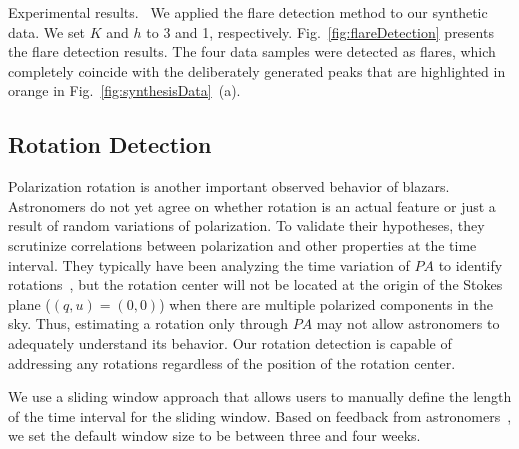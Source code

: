 \textsf{Experimental results.\ } We applied the flare detection method to our synthetic data.
We set $K$ and $h$ to 3 and 1, respectively.
Fig.~\ref{fig:flareDetection} presents the flare detection results.
The four data samples were detected as flares,
which completely coincide with the deliberately generated peaks that are highlighted in orange in Fig.~\ref{fig:synthesisData}~(a).

\subsection{Rotation Detection}\label{sec:rotationDetection}
Polarization rotation is another important observed behavior of blazars. 
Astronomers do not yet agree on whether rotation is an actual feature or just a result of random variations of polarization.
To validate their hypotheses, they scrutinize correlations between polarization and other properties at the time interval.
They typically have been analyzing the time variation of $PA$ to identify rotations~\cite{Ikejiri2011, Uemura2017},
but the rotation center will not be located at the origin of the Stokes plane ($(q, u) = (0, 0)$) when there are multiple polarized components in the sky.
Thus, estimating a rotation only through $PA$ may not allow astronomers to adequately understand its behavior.
Our rotation detection is capable of addressing any rotations regardless of the position of the rotation center.

We use a sliding window approach that allows users to manually define the length of the time interval for the sliding window. Based on feedback from astronomers~\cite{Sasada2012}, we set the default window size to be between three and four weeks.

